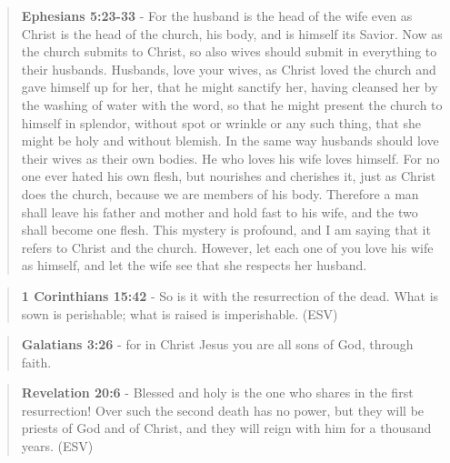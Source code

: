 \documentclass[11pt]{article}
\begin{document}
\begin{quote}
\textbf{Ephesians 5:23-33} - For the husband is the head of the wife even as Christ is the head of the church, his body, and is himself its Savior. Now as the church submits to Christ, so also wives should submit in everything to their husbands. Husbands, love your wives, as Christ loved the church and gave himself up for her, that he might sanctify her, having cleansed her by the washing of water with the word, so that he might present the church to himself in splendor, without spot or wrinkle or any such thing, that she might be holy and without blemish. In the same way husbands should love their wives as their own bodies. He who loves his wife loves himself. For no one ever hated his own flesh, but nourishes and cherishes it, just as Christ does the church, because we are members of his body. Therefore a man shall leave his father and mother and hold fast to his wife, and the two shall become one flesh. This mystery is profound, and I am saying that it refers to Christ and the church. However, let each one of you love his wife as himself, and let the wife see that she respects her husband.
\end{quote}

\begin{quote}
\textbf{1 Corinthians 15:42} -  So is it with the resurrection of the dead.  What is sown is perishable; what is raised is imperishable. (ESV)
\end{quote}

\begin{quote}
\textbf{Galatians 3:26} - for in Christ Jesus you are all sons of God, through faith.
\end{quote}

\begin{quote}
\textbf{Revelation 20:6} - Blessed and holy is the one who shares in the first resurrection! Over such the second death has no power, but they will be priests of God and of Christ, and they will reign with him for a thousand years. (ESV)
\end{quote}
\end{document}
